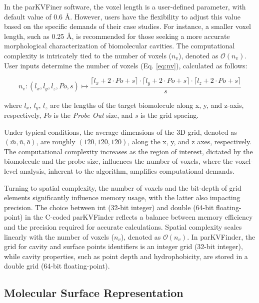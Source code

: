 \documentclass[Ingles]{phdthesis}
\begin{document}
In the parKVFiner software, the voxel length is a user-defined parameter, with default value of 0.6 Å. However, users have the flexibility to adjust this value based on the specific demands of their case studies. For instance, a smaller voxel length, such as 0.25 Å, is recommended for those seeking a more accurate morphological characterization of biomolecular cavities. The computational complexity is intricately tied to the number of voxels ($n_v$), denoted as $\mathcal{O}(n_v)$. User inputs determine the number of voxels (Eq. \ref{eq:nv}), calculated as follows:

\begin{equation}
  n_v \colon (l_x,l_y,l_z,Po,s) \mapsto \frac{\lceil l_x + 2 \cdot Po + s \rceil \cdot \lceil l_y + 2 \cdot Po + s \rceil \cdot \lceil l_z + 2 \cdot Po + s \rceil}{s}
  \label{eq:nv}
\end{equation}

\noindent where $l_x$, $l_y$, $l_z$ are the lengths of the target biomolecule along x, y, and z-axis, respectively, $Po$ is the \textit{Probe Out} size, and $s$ is the grid spacing.

Under typical conditions, the average dimensions of the 3D grid, denoted as $(\bar{m},\bar{n},\bar{o})$, are roughly $(120,120,120)$, along the x, y, and z axes, respectively. The computational complexity increases as the region of interest, dictated by the biomolecule and the probe size, influences the number of voxels, where the voxel-level analysis, inherent to the algorithm, amplifies computational demands.

Turning to spatial complexity, the number of voxels and the bit-depth of grid elements significantly influence memory usage, with the latter also impacting precision. The choice between int (32-bit integer) and double (64-bit floating-point) in the C-coded parKVFinder reflects a balance between memory efficiency and the precision required for accurate calculations. Spatial complexity scales linearly with the number of voxels ($n_v$), denoted as $\mathcal{O}(n_v)$. In parKVFinder, the grid for cavity and surface points identifiers is an integer grid (32-bit integer), while cavity properties, such as point depth and hydrophobicity, are stored in a double grid (64-bit floating-point).

\subsection{Molecular Surface Representation}
\end{document}
